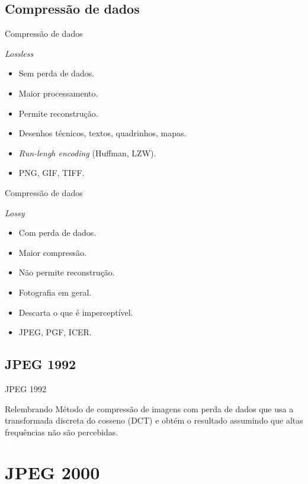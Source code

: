\documentclass{beamer}
\begin{document}
  \subsection{Compressão de dados}
  \begin{frame}{Compressão de dados}
    \begin{block}{\textit{Lossless}}
      \begin{itemize}
        \item Sem perda de dados.
        \item Maior processamento.
        \item Permite reconstrução.
        \item Desenhos técnicos, textos, quadrinhos, mapas.
        \item \emph{Run-lengh encoding} (Huffman, LZW).
        \item PNG, GIF, TIFF.
      \end{itemize}
    \end{block}
  \end{frame}
  \begin{frame}{Compressão de dados}
    \begin{block}{\textit{Lossy}}
      \begin{itemize}
        \item Com perda de dados.
        \item Maior compressão.
        \item Não permite reconstrução.
        \item Fotografia em geral.
        \item Descarta o que é imperceptível.
        \item JPEG, PGF, ICER.
      \end{itemize}
    \end{block}
  \end{frame}
  \subsection{JPEG 1992}
  \begin{frame}{JPEG 1992}
    \begin{block}{Relembrando}
      Método de compressão de imagens com perda de dados que usa a transformada discreta do cosseno (DCT) e obtém o resultado assumindo que altas frequências não são percebidas.
    \end{block}
  \end{frame}
  \section{JPEG 2000}
\end{document}
